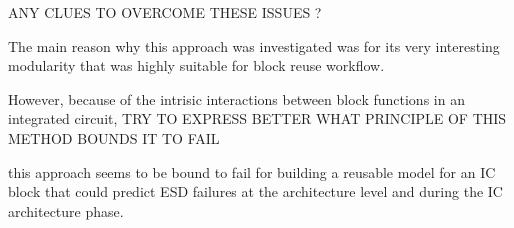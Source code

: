 ANY CLUES TO OVERCOME THESE ISSUES ?

The main reason why this approach was investigated was for its very interesting modularity
that was highly suitable for block reuse workflow.

However, because of the intrisic interactions between block functions in an integrated circuit,
TRY TO EXPRESS BETTER WHAT PRINCIPLE OF THIS METHOD BOUNDS IT TO FAIL

this approach seems to be bound to fail for building a reusable model for an IC block that could predict
ESD failures at the architecture level and during the IC architecture phase.
